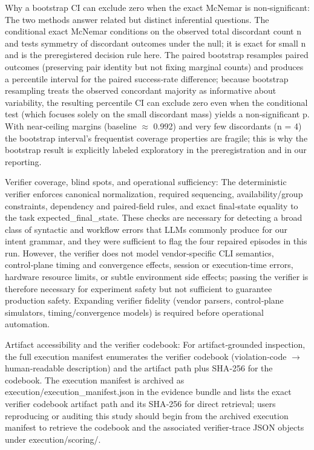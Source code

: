 \documentclass[conference]{IEEEtran}
\begin{document}
Why a bootstrap CI can exclude zero when the exact McNemar is non‑significant: The two methods answer related but distinct inferential questions. The conditional exact McNemar conditions on the observed total discordant count n and tests symmetry of discordant outcomes under the null; it is exact for small n and is the preregistered decision rule here. The paired bootstrap resamples paired outcomes (preserving pair identity but not fixing marginal counts) and produces a percentile interval for the paired success‑rate difference; because bootstrap resampling treats the observed concordant majority as informative about variability, the resulting percentile CI can exclude zero even when the conditional test (which focuses solely on the small discordant mass) yields a non‑significant p. With near‑ceiling margins (baseline \ensuremath{\approx} 0.992) and very few discordants (n = 4) the bootstrap interval's frequentist coverage properties are fragile; this is why the bootstrap result is explicitly labeled exploratory in the preregistration and in our reporting.

Verifier coverage, blind spots, and operational sufficiency: The deterministic verifier enforces canonical normalization, required sequencing, availability/group constraints, dependency and paired‑field rules, and exact final‑state equality to the task expected\_final\_state. These checks are necessary for detecting a broad class of syntactic and workflow errors that LLMs commonly produce for our intent grammar, and they were sufficient to flag the four repaired episodes in this run. However, the verifier does not model vendor‑specific CLI semantics, control‑plane timing and convergence effects, session or execution-time errors, hardware resource limits, or subtle environment side effects; passing the verifier is therefore necessary for experiment safety but not sufficient to guarantee production safety. Expanding verifier fidelity (vendor parsers, control‑plane simulators, timing/convergence models) is required before operational automation.

Artifact accessibility and the verifier codebook: For artifact‑grounded inspection, the full execution manifest enumerates the verifier codebook (violation‑code \ensuremath{\rightarrow} human‑readable description) and the artifact path plus SHA‑256 for the codebook. The execution manifest is archived as execution/execution\_manifest.json in the evidence bundle and lists the exact verifier codebook artifact path and its SHA‑256 for direct retrieval; users reproducing or auditing this study should begin from the archived execution manifest to retrieve the codebook and the associated verifier‑trace JSON objects under execution/scoring/.
\end{document}

